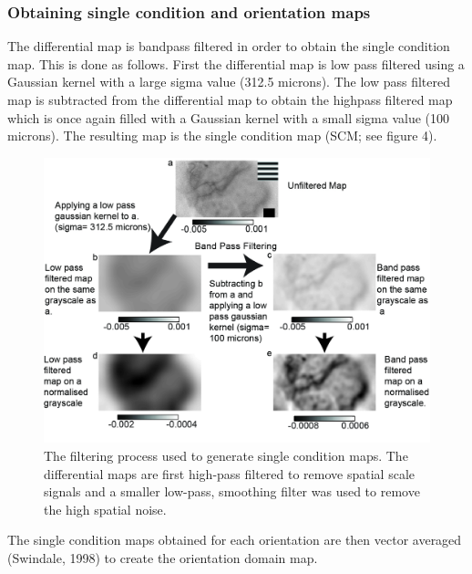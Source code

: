 	\subsubsection{Obtaining single condition and orientation maps}
	
	The differential map is bandpass filtered in order to obtain the single condition map. This is done as follows. First the differential map is low pass filtered using a Gaussian kernel with a large sigma value (312.5 microns). The low pass filtered map is subtracted from the differential map to obtain the highpass filtered map which is once again filled with a Gaussian kernel with a small sigma value (100 microns). The resulting map is the single condition map (SCM; see figure 4).
	
	\begin{figure}[H]
		
		\includegraphics[width=\linewidth]{methods/filters.jpg}
		\caption{The filtering process used to generate single condition maps. The differential maps are first high-pass filtered to remove spatial scale signals and a smaller low-pass, smoothing filter was used to remove the high spatial noise.}
		\label{fig:filters}
	\end{figure}
	
	The single condition maps obtained for each orientation are then vector averaged (Swindale, 1998) to create the orientation domain map.